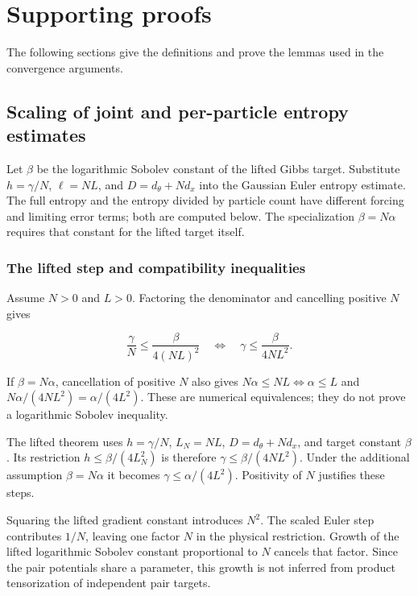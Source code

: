 \documentclass[11pt,a4paper]{report}
\begin{document}
\chapter{Supporting proofs}
The following sections give the definitions and prove the lemmas used in the convergence arguments.

\section{\texorpdfstring{Scaling of joint and per-particle entropy estimates}{Scaling of joint and per-particle entropy estimates}}
\label{proof-module-IPLA-LSI-Scaling-lean}


Let \(\beta\) be the logarithmic Sobolev constant of the lifted Gibbs target. Substitute \(h=\gamma/N\), \(\ell=NL\), and \(D=d_\theta+Nd_x\) into the Gaussian Euler entropy estimate. The full entropy and the entropy divided by particle count have different forcing and limiting error terms; both are computed below. The specialization \(\beta=N\alpha\) requires that constant for the lifted target itself.

\subsection{\texorpdfstring{The lifted step and compatibility inequalities}{The lifted step and compatibility inequalities}}
\label{report-step-IPLA-LSI-Scaling-lean-1}


Assume \(N>0\) and \(L>0\). Factoring the denominator and cancelling positive \(N\) gives

\[\frac\gamma N\le\frac\beta{4(NL)^2}\quad\Longleftrightarrow\quad\gamma\le\frac\beta{4NL^2}.\]

If \(\beta=N\alpha\), cancellation of positive \(N\) also gives \(N\alpha\le NL\Longleftrightarrow\alpha\le L\) and \(N\alpha/(4NL^2)=\alpha/(4L^2)\). These are numerical equivalences; they do not prove a logarithmic Sobolev inequality.



The lifted theorem uses \(h=\gamma/N\), \(L_N=NL\), \(D=d_\theta+Nd_x\), and target constant \(\beta\). Its restriction \(h\le\beta/(4L_N^2)\) is therefore \(\gamma\le\beta/(4NL^2)\). Under the additional assumption \(\beta=N\alpha\) it becomes \(\gamma\le\alpha/(4L^2)\). Positivity of \(N\) justifies these steps.



Squaring the lifted gradient constant introduces \(N^2\). The scaled Euler step contributes \(1/N\), leaving one factor \(N\) in the physical restriction. Growth of the lifted logarithmic Sobolev constant proportional to \(N\) cancels that factor. Since the pair potentials share a parameter, this growth is not inferred from product tensorization of independent pair targets.
\end{document}
